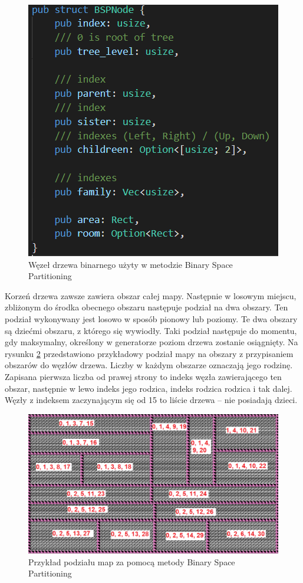 \documentclass[12pt,twoside]{article}
\begin{document}
\FloatBarrier
\begin{figure}[ht]
	\centering
	\includegraphics[width=12cm]{images/generators/bsp_node.png}
	\caption{Węzeł drzewa binarnego użyty w metodzie Binary Space Partitioning}
	\label{generators:bsp_node}
\end{figure}
\FloatBarrier

Korzeń drzewa zawsze zawiera obszar całej mapy. Następnie w losowym miejscu, zbliżonym do środka obecnego obszaru następuje podział na dwa obszary. Ten podział wykonywany jest losowo w sposób pionowy lub poziomy. Te dwa obszary są dziećmi obszaru, z którego się wywiodły. Taki podział następuje do momentu, gdy maksymalny, określony w generatorze poziom drzewa zostanie osiągnięty. Na rysunku \ref{generators:bsp_tree} przedstawiono przykładowy podział mapy na obszary z przypisaniem obszarów do węzłów drzewa. Liczby w każdym obszarze oznaczają jego rodzinę. Zapisana pierwsza liczba od prawej strony to indeks węzła zawierającego ten obszar, następnie w lewo indeks jego rodzica, indeks rodzica rodzica i tak dalej. Węzły z indeksem zaczynającym się od 15 to liście drzewa -- nie posiadają dzieci.

\FloatBarrier
\begin{figure}[ht]
	\centering
	\includegraphics[width=14cm]{images/generators/bsp_tree.png}
	\caption{Przykład podziału map za pomocą metody Binary Space Partitioning}
	\label{generators:bsp_tree}
\end{figure}
\FloatBarrier
\end{document}

